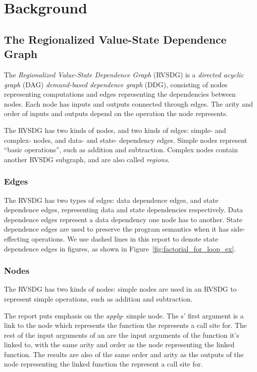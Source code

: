 
\clearpage
\section{Background}
\label{background}

\subsection{The Regionalized Value-State Dependence Graph}
\label{background:RVSDG}

The \textit{Regionalized Value-State Dependence Graph} (RVSDG) is a
\textit{directed acyclic graph} (DAG) \textit{demand-based dependence graph}
(DDG), consisting of nodes representing computations and edges representing the
dependencies between nodes. Each node has inputs and outputs connected through
edges. The arity and order of inputs and outputs depend on the operation the
node represents.

The RVSDG has two kinds of nodes, and two kinds of edges: simple- and complex-
nodes, and data- and state- dependency edges. Simple nodes represent ``basic
operations'', such as addition and subtraction. Complex nodes contain another
RVSDG subgraph, and are also called \textit{regions}.

\subsubsection{Edges}

The RVSDG has two types of edges: data dependence edges, and state dependence
edges, representing data and state dependencies respectively. Data dependence
edges represent a data dependency one node has to another. State dependence
edges are used to preserve the program semantics when it has side-effecting
operations. We use dashed lines in this report to denote state dependence edges
in figures, as shown in Figure~\ref{fig:factorial_for_loop_ex}.

\subsubsection{Nodes}

The RVSDG has two kinds of nodes: simple nodes are used in an RVSDG to represent
simple operations, such as addition and subtraction.

The report puts emphasis on the \textit{apply}- simple node. The \applyNode s'
first argument is a link to the node which represents the function the
\applyNode represents a call site for. The rest of the input arguments of an
\applyNode are the input arguments of the function it's linked to, with the same
arity and order as the node representing the linked function. The results are
also of the same order and arity as the outputs of the node representing the
linked function the \applyNode represent a call site for.

